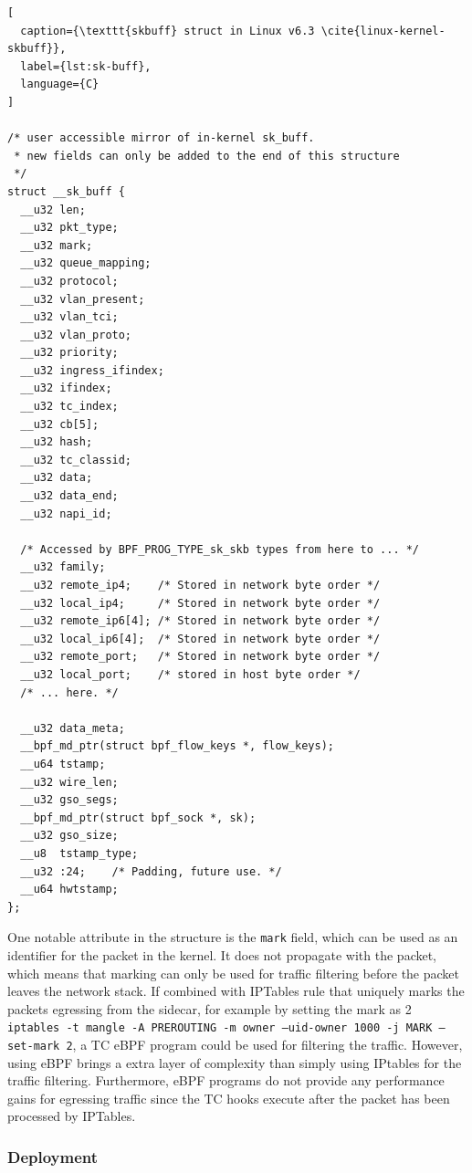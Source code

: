 \documentclass[english, 12pt, a4paper, sci, utf8, a-2b, online]{aaltothesis}
\begin{document}
\begin{lstlisting}[
  caption={\texttt{skbuff} struct in Linux v6.3 \cite{linux-kernel-skbuff}},
  label={lst:sk-buff},
  language={C}
]

/* user accessible mirror of in-kernel sk_buff.
 * new fields can only be added to the end of this structure
 */
struct __sk_buff {
  __u32 len;
  __u32 pkt_type;
  __u32 mark;
  __u32 queue_mapping;
  __u32 protocol;
  __u32 vlan_present;
  __u32 vlan_tci;
  __u32 vlan_proto;
  __u32 priority;
  __u32 ingress_ifindex;
  __u32 ifindex;
  __u32 tc_index;
  __u32 cb[5];
  __u32 hash;
  __u32 tc_classid;
  __u32 data;
  __u32 data_end;
  __u32 napi_id;

  /* Accessed by BPF_PROG_TYPE_sk_skb types from here to ... */
  __u32 family;
  __u32 remote_ip4;    /* Stored in network byte order */
  __u32 local_ip4;     /* Stored in network byte order */
  __u32 remote_ip6[4]; /* Stored in network byte order */
  __u32 local_ip6[4];  /* Stored in network byte order */
  __u32 remote_port;   /* Stored in network byte order */
  __u32 local_port;    /* stored in host byte order */
  /* ... here. */

  __u32 data_meta;
  __bpf_md_ptr(struct bpf_flow_keys *, flow_keys);
  __u64 tstamp;
  __u32 wire_len;
  __u32 gso_segs;
  __bpf_md_ptr(struct bpf_sock *, sk);
  __u32 gso_size;
  __u8  tstamp_type;
  __u32 :24;    /* Padding, future use. */
  __u64 hwtstamp;
};

\end{lstlisting}

One notable attribute in the structure is the \texttt{mark} field, which can be used as an identifier for the packet in the kernel. It does not propagate with the packet, which means that marking can only be used for traffic filtering before the packet leaves the network stack. If combined with IPTables rule that uniquely marks the packets egressing from the sidecar, for example by setting the mark as 2 \texttt{iptables -t mangle -A PREROUTING -m owner --uid-owner 1000 -j MARK --set-mark 2}, a TC eBPF program could be used for filtering the traffic. However, using eBPF brings a extra layer of complexity than simply using IPtables for the traffic filtering. Furthermore, eBPF programs do not provide any performance gains for egressing traffic since the TC hooks execute after the packet has been processed by IPTables.

\subsubsection{Deployment}
\end{document}
